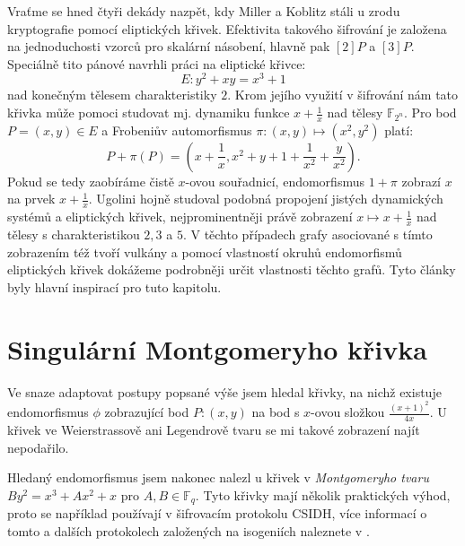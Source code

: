 \documentclass[12pt]{report}
\begin{document}
Vraťme se hned čtyři dekády nazpět, kdy Miller a Koblitz stáli u zrodu kryptografie pomocí eliptických křivek. Efektivita takového šifrování je založena na jednoduchosti vzorců pro skalární násobení, hlavně pak $[2]P$ a $[3]P$. Speciálně tito pánové navrhli práci na eliptické křivce:
$$E : y^2 + xy = x^3 + 1$$
nad konečným tělesem charakteristiky $2$. Krom jejího využití v šifrování nám tato křivka může pomoci studovat mj. dynamiku funkce $x + \frac{1}{x}$ nad tělesy $\mathbb{F}_{2^n}$. Pro bod $P = (x,y) \in E$ a Frobeniův automorfismus  $\pi : (x,y) \longmapsto (x^2,y^2)$ platí:
$$P + \pi (P) = \left(x + \frac{1}{x} ,  x^2 + y + 1 + \frac{1}{x^2} + \frac{y}{x^2} \right).$$
Pokud se tedy zaobíráme čistě $x$-ovou souřadnicí, endomorfismus $1+\pi$ zobrazí $x$ na prvek $x+\frac{1}{x}$. Ugolini \cite{Ugolini,Ugolini2,Ugolini3,Ugolini4} hojně studoval podobná propojení jistých dynamických systémů a eliptických křivek, nejprominentněji právě zobrazení $x \longmapsto x+\frac{1}{x}$ nad tělesy s charakteristikou $2,3$ a $5$. V těchto případech grafy asociované s tímto zobrazením též tvoří vulkány a pomocí vlastností okruhů endomorfismů eliptických křivek dokážeme podrobněji určit vlastnosti těchto grafů. Tyto články byly hlavní inspirací pro tuto kapitolu. 


\section{Singulární Montgomeryho křivka}

Ve snaze adaptovat postupy popsané výše jsem hledal křivky, na nichž existuje endomorfismus $\phi$ zobrazující bod $P : (x,y)$ na bod s $x$-ovou složkou $\frac{(x+1)^2}{4x}$. U křivek ve Weierstrassově ani Legendrově tvaru se mi takové zobrazení najít nepodařilo. 

Hledaný endomorfismus jsem nakonec nalezl u křivek v \textit{Montgomeryho tvaru} $ B y^2 = x^3 + A x^2 +x$ pro $A,B \in \mathbb{F}_q$. Tyto křivky mají několik praktických výhod, proto se například používají v šifrovacím protokolu CSIDH, více informací o tomto a dalších protokolech založených na isogeniích naleznete v \cite{Pezlar}.
\end{document}
